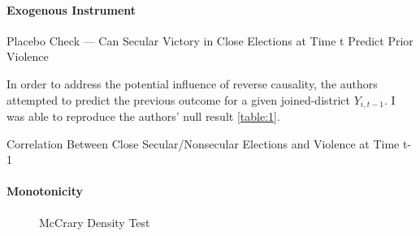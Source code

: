 \documentclass{scrartcl}
\begin{document}
\paragraph{Exogenous Instrument} \label{exo}
\begin{table}[ht]
  \begin{center}
    \scalebox{0.75}{
      
    }
    \caption{Placebo Check — Can Secular Victory in Close Elections at Time t Predict Prior Violence}
    \label{table:1}
  \end{center}
\end{table}

In order to address the potential influence of reverse causality, the authors attempted to predict the previous outcome for a given joined-district $Y_{i,t-1}$.
I was able to reproduce the authors' null result \ref{table:1}.

\begin{table}[ht]
  \begin{center}
    \scalebox{0.75}{
      
    }
    \caption{Correlation Between Close Secular/Nonsecular Elections and Violence at Time t-1}
    \label{table:4}
  \end{center}
\end{table}

\paragraph{Monotonicity}

\begin{figure}[h]
  \centering
  \caption{McCrary Density Test}
  \label{fig:density}
\end{figure}
\end{document}
